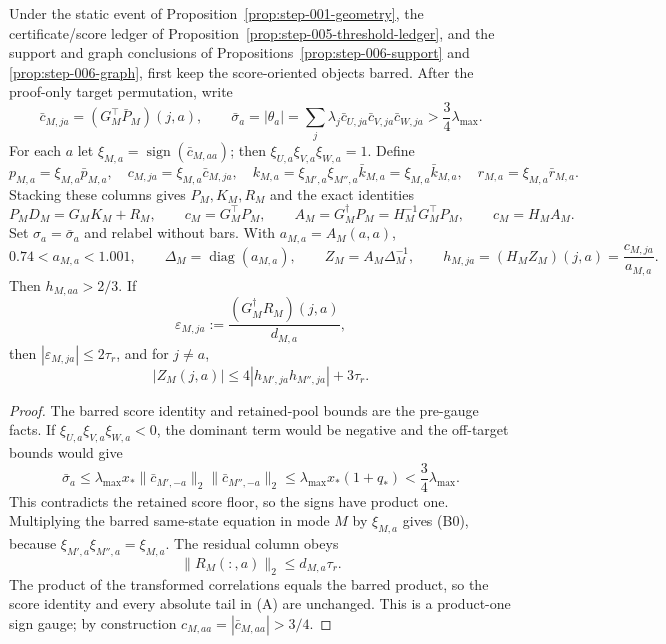 \begin{lemma}\label{lem:step-007-dual-equation}

Under the static event of Proposition~\ref{prop:step-001-geometry}, the
certificate/score ledger of Proposition~\ref{prop:step-005-threshold-ledger},
and the support and graph conclusions of Propositions~\ref{prop:step-006-support}
and \ref{prop:step-006-graph}, first keep the score-oriented objects barred.
After the proof-only target permutation, write
\[
\bar c_{M,ja}=(G_M^\top\bar P_M)(j,a),\qquad
\bar\sigma_a=|\theta_a|
 =\sum_j\lambda_j\bar c_{U,ja}\bar c_{V,ja}\bar c_{W,ja}
 >\frac34\lambda_{\max}.
\tag{A.1}
\]
For each $a$ let $\xi_{M,a}=\operatorname{sign}(\bar c_{M,aa})$; then
$\xi_{U,a}\xi_{V,a}\xi_{W,a}=1$.  Define
\[
 p_{M,a}=\xi_{M,a}\bar p_{M,a},\quad
 c_{M,ja}=\xi_{M,a}\bar c_{M,ja},\quad
 k_{M,a}=\xi_{M',a}\xi_{M'',a}\bar k_{M,a}=\xi_{M,a}\bar k_{M,a},\quad
 r_{M,a}=\xi_{M,a}\bar r_{M,a}.
\tag{A.2}
\]
Stacking these columns gives $P_M,K_M,R_M$ and the exact identities
\[
 P_MD_M=G_MK_M+R_M,\qquad c_M=G_M^\top P_M,\qquad
 A_M=G_M^\dagger P_M=H_M^{-1}G_M^\top P_M,\qquad c_M=H_MA_M.
\tag{B0}
\]
Set $\sigma_a=\bar\sigma_a$ and relabel without bars.  With
$a_{M,a}=A_M(a,a)$,
\[
 0.74<a_{M,a}<1.001,\qquad
 \Delta_M=\operatorname{diag}(a_{M,a}),\qquad
 Z_M=A_M\Delta_M^{-1},\qquad
 h_{M,ja}=(H_MZ_M)(j,a)=\frac{c_{M,ja}}{a_{M,a}}.
\tag{A.3}
\]
Then $h_{M,aa}>2/3$.  If
\[
 \varepsilon_{M,ja}:=\frac{(G_M^\dagger R_M)(j,a)}{d_{M,a}},
\]
then $|\varepsilon_{M,ja}|\le2\tau_r$, and for $j\ne a$,
\[
 |Z_M(j,a)|\le4|h_{M',ja}h_{M'',ja}|+3\tau_r.
\tag{B}
\]

\begin{proof}

The barred score identity and retained-pool bounds are the pre-gauge facts.
If $\xi_{U,a}\xi_{V,a}\xi_{W,a}<0$, the dominant term would be negative and
the off-target bounds would give
\[
\bar\sigma_a\le\lambda_{\max}x_*
 \|\bar c_{M',-a}\|_2\|\bar c_{M'',-a}\|_2
 \le\lambda_{\max}x_*(1+q_*)<\frac34\lambda_{\max}.
\tag{A.4}
\]
This contradicts the retained score floor, so the signs have product one.
Multiplying the barred same-state equation in mode $M$ by $\xi_{M,a}$ gives
(B0), because $\xi_{M',a}\xi_{M'',a}=\xi_{M,a}$. The residual column obeys
\[
\|R_M(:,a)\|_2\le d_{M,a}\tau_r.
\tag{A.5}
\]
The product of the transformed correlations equals the barred product, so the
score identity and every absolute tail in (A) are unchanged. This is a
product-one sign gauge; by construction $c_{M,aa}=|\bar c_{M,aa}|>3/4$.


\end{proof}
\end{lemma}
